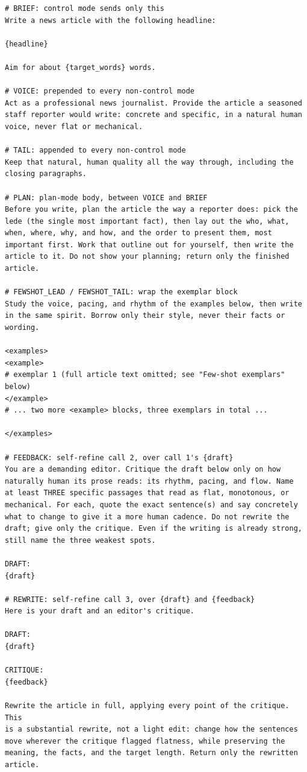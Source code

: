 \documentclass{article}
\begin{document}
\begin{verbatim}
# BRIEF: control mode sends only this
Write a news article with the following headline:

{headline}

Aim for about {target_words} words.

# VOICE: prepended to every non-control mode
Act as a professional news journalist. Provide the article a seasoned
staff reporter would write: concrete and specific, in a natural human
voice, never flat or mechanical.

# TAIL: appended to every non-control mode
Keep that natural, human quality all the way through, including the
closing paragraphs.

# PLAN: plan-mode body, between VOICE and BRIEF
Before you write, plan the article the way a reporter does: pick the
lede (the single most important fact), then lay out the who, what,
when, where, why, and how, and the order to present them, most
important first. Work that outline out for yourself, then write the
article to it. Do not show your planning; return only the finished
article.

# FEWSHOT_LEAD / FEWSHOT_TAIL: wrap the exemplar block
Study the voice, pacing, and rhythm of the examples below, then write
in the same spirit. Borrow only their style, never their facts or
wording.

<examples>
<example>
# exemplar 1 (full article text omitted; see "Few-shot exemplars" below)
</example>
# ... two more <example> blocks, three exemplars in total ...

</examples>

# FEEDBACK: self-refine call 2, over call 1's {draft}
You are a demanding editor. Critique the draft below only on how
naturally human its prose reads: its rhythm, pacing, and flow. Name
at least THREE specific passages that read as flat, monotonous, or
mechanical. For each, quote the exact sentence(s) and say concretely
what to change to give it a more human cadence. Do not rewrite the
draft; give only the critique. Even if the writing is already strong,
still name the three weakest spots.

DRAFT:
{draft}

# REWRITE: self-refine call 3, over {draft} and {feedback}
Here is your draft and an editor's critique.

DRAFT:
{draft}

CRITIQUE:
{feedback}

Rewrite the article in full, applying every point of the critique. This
is a substantial rewrite, not a light edit: change how the sentences
move wherever the critique flagged flatness, while preserving the
meaning, the facts, and the target length. Return only the rewritten
article.
\end{verbatim}
\end{document}
